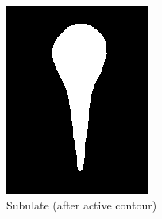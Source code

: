 \documentclass[12pt,english]{article}
\begin{document}
\begin{figure}[!hbt]
\begin{centre}
\begin{minipage}{0.32\textwidth}
		\includegraphics[width=\textwidth]{../code/contour/contour_mask/spathulate}
	\end{minipage}
	\begin{minipage}{0.32\textwidth}
		\caption{Subulate (after active contour)}
		\label{contourmask:3}

\end{minipage}
\end{centre}
\end{figure}
\end{document}
